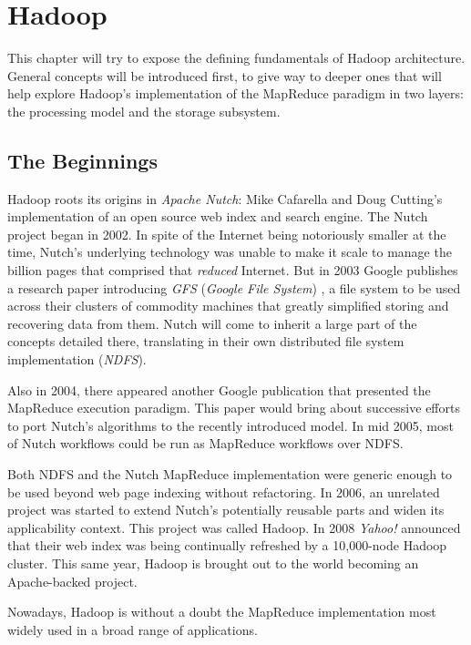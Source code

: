\chapter{Hadoop}\label{cap:hadoop}
\noindent This chapter will try to expose the defining fundamentals of Hadoop architecture. General concepts will be introduced first, to give way to deeper ones that will help explore Hadoop's implementation of the MapReduce paradigm in two layers: the processing model and the storage subsystem.

\section{The Beginnings}\label{sec:origen}
\noindent Hadoop roots its origins in \emph{Apache Nutch}: Mike Cafarella and Doug Cutting's implementation of an open source web index and search engine. The Nutch project began in 2002. In spite of the Internet being notoriously smaller at the time, Nutch's underlying technology was unable to make it scale to manage the billion pages that comprised that \emph{reduced} Internet. But in 2003 Google publishes a research paper introducing \emph{GFS} (\emph{Google File System}) \cite{gfs}, a file system to be used across their clusters of commodity machines that greatly simplified storing and recovering data from them. Nutch will come to inherit a large part of the concepts detailed there, translating in their own distributed file system implementation (\emph{NDFS}).

Also in 2004, there appeared another Google publication \cite{googlemapreduce} that presented the MapReduce execution paradigm. This paper would bring about successive efforts to port Nutch's algorithms to the recently introduced model. In mid 2005, most of Nutch workflows could be run as MapReduce workflows over NDFS.

Both NDFS and the Nutch MapReduce implementation were generic enough to be used beyond web page indexing without refactoring. In 2006, an unrelated project was started to extend Nutch's potentially reusable parts and widen its applicability context. This project was called Hadoop. In 2008 \emph{Yahoo!} announced that their web index was being continually refreshed by a 10,000-node Hadoop cluster. This same year, Hadoop is brought out to the world becoming an Apache-backed project.

Nowadays, Hadoop is without a doubt the MapReduce implementation most widely used in a broad range of applications.

